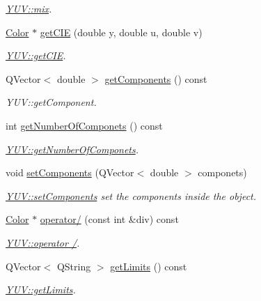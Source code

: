 \begin{DoxyCompactItemize}
\begin{DoxyCompactList}\small\item\em \hyperlink{class_y_u_v_ab152a4ea37eaa67df0b38882c2099da3}{Y\+U\+V\+::mix}. \end{DoxyCompactList}\item 
\hyperlink{class_color}{Color} $\ast$ \hyperlink{class_y_u_v_a56f11c27f1659c30ebd20c929704e004}{get\+C\+IE} (double y, double u, double v)
\begin{DoxyCompactList}\small\item\em \hyperlink{class_y_u_v_a56f11c27f1659c30ebd20c929704e004}{Y\+U\+V\+::get\+C\+IE}. \end{DoxyCompactList}\item 
Q\+Vector$<$ double $>$ \hyperlink{class_y_u_v_ad90109db3486e61e248e274a7690824a}{get\+Components} () const
\begin{DoxyCompactList}\small\item\em Y\+U\+V\+::get\+Component. \end{DoxyCompactList}\item 
int \hyperlink{class_y_u_v_a46eded5c13a0c2b2e9bbf05d4a2f9c7c}{get\+Number\+Of\+Componets} () const
\begin{DoxyCompactList}\small\item\em \hyperlink{class_y_u_v_a46eded5c13a0c2b2e9bbf05d4a2f9c7c}{Y\+U\+V\+::get\+Number\+Of\+Componets}. \end{DoxyCompactList}\item 
void \hyperlink{class_y_u_v_a622daf7a688da4a227b63deb412c0d46}{set\+Components} (Q\+Vector$<$ double $>$ componets)
\begin{DoxyCompactList}\small\item\em \hyperlink{class_y_u_v_a622daf7a688da4a227b63deb412c0d46}{Y\+U\+V\+::set\+Components} set the components inside the object. \end{DoxyCompactList}\item 
\hyperlink{class_color}{Color} $\ast$ \hyperlink{class_y_u_v_a1b9300c00323eca16fc4bb028964e85f}{operator/} (const int \&div) const
\begin{DoxyCompactList}\small\item\em \hyperlink{class_y_u_v_a1b9300c00323eca16fc4bb028964e85f}{Y\+U\+V\+::operator /}. \end{DoxyCompactList}\item 
Q\+Vector$<$ Q\+String $>$ \hyperlink{class_y_u_v_a344cd573b663c97f5554afcb1c15458c}{get\+Limits} () const
\begin{DoxyCompactList}\small\item\em \hyperlink{class_y_u_v_a344cd573b663c97f5554afcb1c15458c}{Y\+U\+V\+::get\+Limits}. \end{DoxyCompactList}\end{DoxyCompactItemize}
